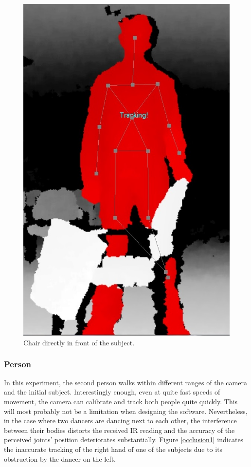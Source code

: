 \documentclass[11pt,a4paper]{article}
\begin{document}
\begin{figure}[H]
\center
\includegraphics[scale=0.2]{Chair.jpg} 
\caption{Chair directly in front of the subject.}
\label{chair}
\end{figure} 
\subsubsection{Person}
\noindent
In this experiment, the second person walks within different ranges of the camera and the initial subject. Interestingly enough, even at quite fast speeds of movement, the camera can calibrate and track both people quite quickly. This will most probably not be a limitation when designing the software. Nevertheless, in the case where two dancers are dancing next to each other, the interference between their bodies distorts the received IR reading and the accuracy of the perceived joints' position deteriorates substantially. Figure \ref{occlusion1} indicates the inaccurate tracking of the right hand of one of the subjects due to its obstruction by the dancer on the left.
\end{document}
